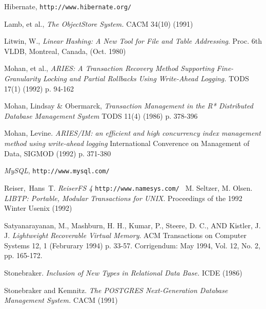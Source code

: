 \documentclass[10pt,letterpaper,twocolumn,english]{article}
\begin{document}
\begin{thebibliography}{99}
\begin{small}
 Hibernate, {\tt http://www.hibernate.org/}

 Lamb, et al., {\em The ObjectStore System.} CACM 34(10) (1991)


 Litwin, W., {\em Linear Hashing: A New Tool for File and Table Addressing}. Proc. 6th VLDB, Montreal, Canada, (Oct. 1980) %

 Mohan, et al., {\em ARIES: A Transaction Recovery Method Supporting Fine-Granularity Locking and Partial Rollbacks Using Write-Ahead Logging.} TODS 17(1) (1992) p. 94-162

 Mohan, Lindsay \& Obermarck, {\em Transaction Management in the R* Distributed Database Management System} TODS 11(4) (1986) p. 378-396

 Mohan, Levine. {\em ARIES/IM: an efficient and high concurrency index management method using write-ahead logging} International Converence on Management of Data, SIGMOD (1992) p. 371-380

 {\em MySQL}, {\tt http://www.mysql.com/ }

 Reiser,~Hans~T. {\em ReiserFS 4} {\tt http://www.namesys.com/ }
%
 M. Seltzer, M. Olsen. {\em LIBTP: Portable, Modular Transactions for UNIX}. Proceedings of the 1992 Winter Usenix (1992)

 Satyanarayanan, M., Mashburn, H. H., Kumar, P., Steere, D. C., AND Kistler, J. J. {\em Lightweight Recoverable Virtual Memory}. ACM Transactions on Computer Systems 12, 1 (Februrary 1994) p. 33-57. Corrigendum: May 1994, Vol. 12, No. 2, pp. 165-172.

 Stonebraker. {\em Inclusion of New Types in Relational Data Base. } ICDE (1986) %

 Stonebraker and Kemnitz. {\em The POSTGRES Next-Generation Database Management System. } CACM (1991)

%
%



\end{small}
\end{thebibliography}
\end{document}
